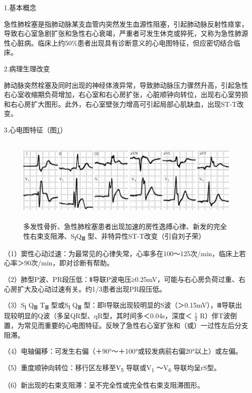 1.基本概念

急性肺栓塞是指肺动脉某支血管内突然发生血源性阻塞，引起肺动脉反射性痉挛，导致右心室急剧扩张和急性右心衰竭，严重者可发生休克或猝死，又称为急性肺源性心脏病。临床上约50\%患者出现具有诊断意义的心电图特征，但应密切结合临床。

2.病理生理改变

肺动脉突然栓塞及同时出现的神经体液异常，导致肺动脉压力骤然升高，引起急性右心室收缩期负荷增加，右心室和右心房扩张，心脏顺钟向转位，出现右心室劳损和右心房扩大图形。此外，右心室壁张力增高可引起局部心肌缺血，出现ST-T改变。

3.心电图特征（图\ref{fig42-7}）

\begin{figure}[!htbp]
 \centering
 \includegraphics[width=5.78125in,height=1.67708in]{./images/Image00698.jpg}
 \captionsetup{justification=centering}
 \caption{多发性骨折、急性肺栓塞患者出现加速的房性逸搏心律、新发的完全性右束支阻滞、S\textsubscript{Ⅰ}Q\textsubscript{Ⅲ} 型、非特异性ST-T改变（引自刘子荣）}
 \label{fig42-7}
  \end{figure} 


（1）窦性心动过速：为最常见的心律失常，心率多在100～125次/min，临床上若心率＞90次/min，即对诊断有帮助。

（2）肺型P波、PR段压低：Ⅱ导联P波电压≥0.25mV，可能与右心房负荷过重、右心房扩大及心动过速有关。约1/3患者出现PR段压低。

（3）S\textsubscript{Ⅰ} Q\textsubscript{Ⅲ} T\textsubscript{Ⅲ}
型或S\textsubscript{Ⅰ} Q\textsubscript{Ⅲ}
型：即Ⅰ导联出现较明显的S波（＞0.15mV），Ⅲ导联出现较明显的Q波（多呈QR型、qR型，其时间多＜0.04s，深度＜
$\frac{1}{4}$
R）伴T波倒置，为常见而重要的心电图特征。反映了急性右心室扩张和（或）一过性左后分支阻滞。

（4）电轴偏移：可发生右偏（＋90°～＋100°或较发病前右偏20°以上）或左偏。

（5）重度顺钟向转位：移行区左移至V\textsubscript{5}
导联或V\textsubscript{1} ～V\textsubscript{6} 导联均呈rS型。

（6）新出现的右束支阻滞：呈不完全性或完全性右束支阻滞图形。

